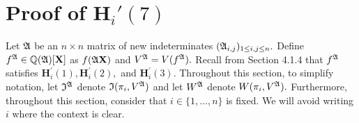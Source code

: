 \documentclass[sigconf]{acmart}
\def\I{\frak{I}}
\def\A{\frak{A}}
\begin{document}
\section{Proof of $\textbf{H}_i'(7)$}
%
Let $\A$ be an $n \times n$ matrix of new indeterminates $(\A_{i,j})_{1 \leq i , j \leq n}.$ Define $f^{\A} \in \mathbb{Q}(\A)[\textbf{X}]$ as $f(\A\textbf{X})$ and $V^\A=V(f^\A).$ Recall from Section 4.1.4 that $f^\A$ satisfies $\textbf{H}_i^{'}(1),\textbf{H}_i^{'}(2),$ and $\textbf{H}_i^{'}(3).$ Throughout this section, to simplify notation, let $\I^\A$ denote $\I(\pi_i,V^\A)$ and let $W^\A$ denote $W(\pi_i,V^\A).$ Furthermore, throughout this section, consider that $i \in \{1,\hdots,n\}$ is fixed. We will avoid writing $i$ where the context is clear. 
%
\end{document}
